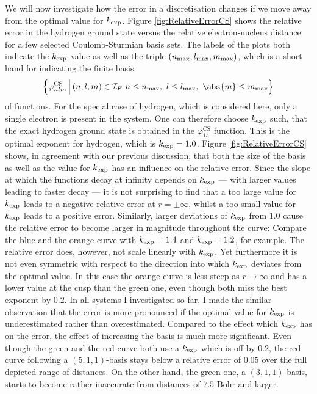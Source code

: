 We will now investigate how the error in a \CS discretisation
changes if we move away from the optimal value for $k_\text{exp}$.
Figure \vref{fig:RelativeErrorCS} shows the relative error in the hydrogen ground state
versus the relative electron-nucleus distance
for a few selected Coulomb-Sturmian basis sets.
The labels of the plots both indicate the $k_\text{exp}$ value as well as the
triple  $(n_\text{max}, l_\text{max}, m_\text{max})$, which is a short hand for indicating
the finite basis
\[ \left\{ \varphi^\text{CS}_{nlm} \, \Big| \, (n,l,m) \in \Itpf \
	n \leq \nmax, \ l \leq \lmax, \ \abs{m} \leq \mmax \right\} \]
of \CS functions.
For the special case of hydrogen, which is considered here,
only a single electron is present in the system.
One can therefore choose $k_\text{exp}$ such, that the exact hydrogen ground state
is obtained in the $\varphi^\text{CS}_{1s}$ function.
This is the optimal exponent for hydrogen, which is $k_\text{exp} = 1.0$.
Figure \vref{fig:RelativeErrorCS} shows, in agreement with our previous discussion,
that both the size of the basis as well as the value for $k_\text{exp}$ has an influence
on the relative error.
Since the slope at which the \CS functions decay
at infinity depends on $k_\text{exp}$ ---
with larger values leading to faster decay ---
it is not surprising to find that
a too large value for $k_\text{exp}$ leads to a negative relative error at $r = \pm \infty$,
whilst a too small value for $k_\text{exp}$ leads to a positive error.
Similarly, larger deviations of $k_\text{exp}$ from $1.0$
cause the relative error to become larger in magnitude throughout the curve:
Compare the blue and the orange curve with $k_\text{exp} = 1.4$ and $k_\text{exp} = 1.2$,
for example.
The relative error does, however, not scale linearly with $k_\text{exp}$.
Yet furthermore it is not even symmetric with respect to the direction
into which $k_\text{exp}$ deviates from the optimal value.
In this case the orange curve is less steep as $r\to\infty$ and has a lower value
at the cusp than the green one,
even though both miss the best exponent by $0.2$.
In all systems I investigated so far,
I made the similar observation that the error is more pronounced if the optimal
value for $k_\text{exp}$ is underestimated rather than overestimated.
Compared to the effect which $k_\text{exp}$ has on the error,
the effect of increasing the basis is much more significant.
Even though the green and the red curve both use a $k_\text{exp}$
which is off by $0.2$,
the red curve following a $(5,1,1)$-basis
stays below a relative error of $0.05$
over the full depicted range of distances.
On the other hand, the green one, a $(3,1,1)$-basis,
starts to become rather inaccurate from distances
of $7.5$ Bohr and larger.

